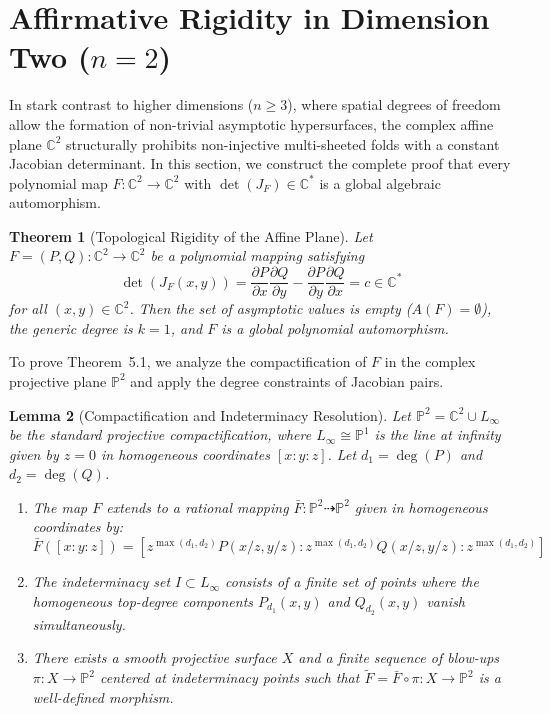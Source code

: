 \documentclass[11pt,reqno]{amsart}
\newtheorem{theorem}{Theorem}[section]
\newtheorem{lemma}[theorem]{Lemma}
\theoremstyle{definition}
\begin{document}
\section{Affirmative Rigidity in Dimension Two ($n=2$)}

In stark contrast to higher dimensions ($n \ge 3$), where spatial degrees of freedom allow the formation of non-trivial asymptotic hypersurfaces, the complex affine plane $\mathbb{C}^2$ structurally prohibits non-injective multi-sheeted folds with a constant Jacobian determinant. In this section, we construct the complete proof that every polynomial map $F: \mathbb{C}^2 \to \mathbb{C}^2$ with $\det(J_F) \in \mathbb{C}^*$ is a global algebraic automorphism.

\begin{theorem}[Topological Rigidity of the Affine Plane]
Let $F = (P, Q): \mathbb{C}^2 \to \mathbb{C}^2$ be a polynomial mapping satisfying 
$$\det(J_F(x,y)) = \frac{\partial P}{\partial x}\frac{\partial Q}{\partial y} - \frac{\partial P}{\partial y}\frac{\partial Q}{\partial x} = c \in \mathbb{C}^*$$
for all $(x,y) \in \mathbb{C}^2$. Then the set of asymptotic values is empty ($A(F) = \emptyset$), the generic degree is $k = 1$, and $F$ is a global polynomial automorphism.
\end{theorem}

To prove Theorem~5.1, we analyze the compactification of $F$ in the complex projective plane $\mathbb{P}^2$ and apply the degree constraints of Jacobian pairs.

\begin{lemma}[Compactification and Indeterminacy Resolution]
Let $\mathbb{P}^2 = \mathbb{C}^2 \cup L_\infty$ be the standard projective compactification, where $L_\infty \cong \mathbb{P}^1$ is the line at infinity given by $z = 0$ in homogeneous coordinates $[x:y:z]$. Let $d_1 = \deg(P)$ and $d_2 = \deg(Q)$. 
\begin{enumerate}
    \item The map $F$ extends to a rational mapping $\bar{F}: \mathbb{P}^2 \dashrightarrow \mathbb{P}^2$ given in homogeneous coordinates by:
    $$\bar{F}([x:y:z]) = [z^{\max(d_1,d_2)} P(x/z, y/z) : z^{\max(d_1,d_2)} Q(x/z, y/z) : z^{\max(d_1,d_2)}]$$
    \item The indeterminacy set $I \subset L_\infty$ consists of a finite set of points where the homogeneous top-degree components $P_{d_1}(x,y)$ and $Q_{d_2}(x,y)$ vanish simultaneously.
    \item There exists a smooth projective surface $X$ and a finite sequence of blow-ups $\pi: X \to \mathbb{P}^2$ centered at indeterminacy points such that $\tilde{F} = \bar{F} \circ \pi: X \to \mathbb{P}^2$ is a well-defined morphism.
\end{enumerate}
\end{lemma}
\end{document}
